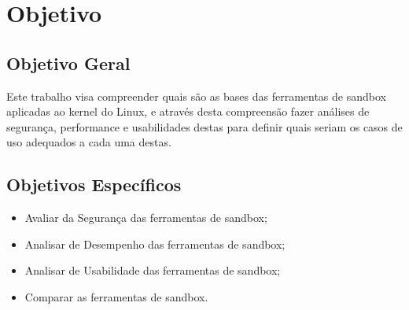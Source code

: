\chapter{Objetivo}

\section*{Objetivo Geral}
Este trabalho visa compreender quais são as bases das ferramentas de sandbox aplicadas ao kernel do Linux, e através desta compreensão fazer análises de segurança, performance e usabilidades destas para definir quais seriam os casos de uso adequados a cada uma destas.

\section*{Objetivos Específicos}
\begin{itemize}
    \item Avaliar da Segurança das ferramentas de sandbox;
    \item Analisar de Desempenho das ferramentas de sandbox;
    \item Analisar de Usabilidade das ferramentas de sandbox;
    \item Comparar as ferramentas de sandbox.
\end{itemize}

